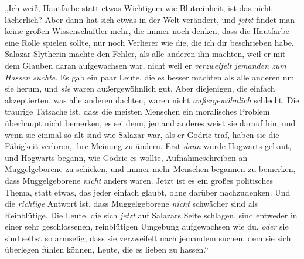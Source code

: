 „Ich weiß, Hautfarbe statt etwas Wichtigem wie Blutreinheit, ist das nicht lächerlich? Aber dann hat sich etwas in der Welt verändert, und \emph{jetzt} findet man keine großen Wissenschaftler mehr, die immer noch denken, dass die Hautfarbe eine Rolle spielen sollte, nur noch Verlierer wie die, die ich dir beschrieben habe. Salazar Slytherin machte den Fehler, als alle anderen ihn machten, weil er mit dem Glauben daran aufgewachsen war, nicht weil er \emph{verzweifelt jemanden zum Hassen suchte}. Es gab ein paar Leute, die es besser machten als alle anderen um sie herum, und \emph{sie} waren außergewöhnlich gut. Aber diejenigen, die einfach akzeptierten, was alle anderen dachten, waren nicht \emph{außergewöhnlich} schlecht. Die traurige Tatsache ist, dass die meisten Menschen ein moralisches Problem überhaupt nicht bemerken, es sei denn, jemand anderes weist sie darauf hin; und wenn sie einmal so alt sind wie Salazar war, als er Godric traf, haben sie die Fähigkeit verloren, ihre Meinung zu ändern. Erst \emph{dann} wurde Hogwarts gebaut, und Hogwarts begann, wie Godric es wollte, Aufnahmeschreiben an Muggelgeborene zu schicken, und immer mehr Menschen begannen zu bemerken, dass Muggelgeborene \emph{nicht} anders waren. Jetzt ist es ein großes politisches Thema, statt etwas, das jeder einfach glaubt, ohne darüber nachzudenken. Und die \emph{richtige} Antwort ist, dass Muggelgeborene \emph{nicht} schwächer sind als Reinblütige. Die Leute, die sich \emph{jetzt} auf Salazars Seite schlagen, sind entweder in einer sehr geschlossenen, reinblütigen Umgebung aufgewachsen wie du, \emph{oder} sie sind selbst so armselig, dass sie verzweifelt nach jemandem suchen, dem sie sich überlegen fühlen können, Leute, die es lieben zu hassen.“

